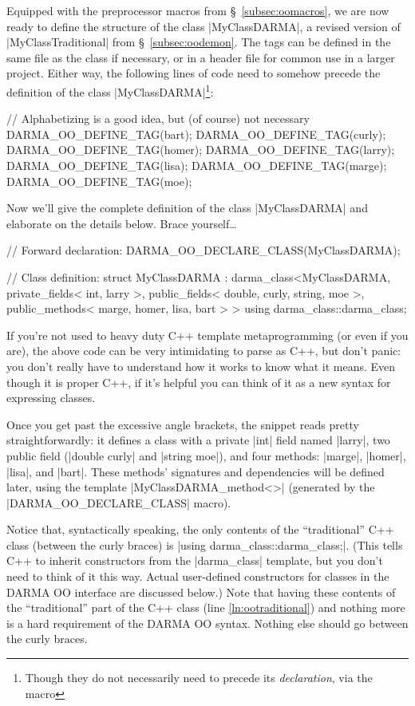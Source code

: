 Equipped with the preprocessor macros from \S~\ref{subsec:oomacros}, we are now
ready to define the structure of the class |MyClassDARMA|, a revised version of
|MyClassTraditional| from \S~\ref{subsec:oodemon}.  The tags can be defined in
the same file as the class if necessary, or in a header file for common use in a
larger project.  Either way, the following lines of code need to somehow precede
the definition of the class |MyClassDARMA|\footnote{Though they do not
necessarily need to precede its {\it declaration}, via the macro
}:
\begin{CppCodeNumb}
// Alphabetizing is a good idea, but (of course) not necessary
DARMA_OO_DEFINE_TAG(bart);
DARMA_OO_DEFINE_TAG(curly);
DARMA_OO_DEFINE_TAG(homer);
DARMA_OO_DEFINE_TAG(larry);
DARMA_OO_DEFINE_TAG(lisa);
DARMA_OO_DEFINE_TAG(marge);
DARMA_OO_DEFINE_TAG(moe);
\end{CppCodeNumb}
Now we'll give the complete definition of the class |MyClassDARMA| and elaborate
on the details below.  Brace yourself\ldots
\begin{CppCodeNumb}
// Forward declaration:
DARMA_OO_DECLARE_CLASS(MyClassDARMA);

// Class definition:
struct MyClassDARMA
  : darma_class<MyClassDARMA,
      private_fields<
        int, larry
      >,
      public_fields<
        double, curly,
        string, moe
      >,
      public_methods<
        marge,
        homer,
        lisa,
        bart
      >
    >
{ using darma_class::darma_class; } $\label{ln:ootraditional}$
\end{CppCodeNumb}
If you're not used to heavy duty C++ template metaprogramming (or even if you
are), the above code can be very intimidating to parse as C++, but don't panic:
you don't really have to understand how it works to know what it means.  Even
though it is proper C++, if it's helpful you can think of it as a new syntax
for expressing classes.

Once you get past the excessive angle brackets, the snippet reads pretty
straightforwardly:  it defines a class with a private |int| field named |larry|,
two public field (|double curly| and |string moe|), and four methods: |marge|,
|homer|, |lisa|, and |bart|.  These methods' signatures and dependencies will be
defined later, using the template |MyClassDARMA_method<>| (generated by the
|DARMA_OO_DECLARE_CLASS| macro).

Notice that, syntactically speaking, the only
contents of the ``traditional'' C++ class (between the curly braces) is 
|using darma_class::darma_class;|.  (This tells C++ to inherit constructors from
the |darma_class| template, but you don't need to think of it this way.  Actual
user-defined constructors for classes in the DARMA OO interface are discussed
below.)  Note that having these contents of the ``traditional'' part of the C++
class (line \ref{ln:ootraditional}) and nothing more is a hard requirement of
the DARMA OO syntax.  Nothing else should go between the curly braces.


